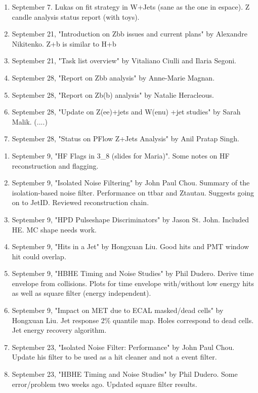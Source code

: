 \begin{enumerate}
\item September 7.  Lukas on fit strategy in W+Jets (sane as the one in espace).  Z candle analysis status report (with toys).
\item September 21, "Introduction on Zbb issues and current plans" by Alexandre Nikitenko.  Z+b is similar to H+b
\item September 21, "Task list overview" by Vitaliano Ciulli and Ilaria Segoni.
\item September 28, "Report on Zbb analysis" by Anne-Marie Magnan.
\item September 28, "Report on Zb(b) analysis" by Natalie Heracleous.
\item September 28, "Update on Z(ee)+jets and W(enu) +jet studies" by Sarah Malik. (....)
\item September 28, "Status on PFlow Z+Jets Analysis" by Anil Pratap Singh.
\end{enumerate}



\begin{enumerate}
\item September 9, "HF Flags in 3\_8 (slides for Maria)".  Some notes on HF reconstruction and flagging.
\item September 9, "Isolated Noise Filtering" by John Paul Chou.  Summary of the isolation-based noise filter.  Performance on ttbar and Ztautau.
Suggests going on to JetID.  Reviewed reconstruction chain.
\item September 9, "HPD Pulseshape Discriminators" by Jason St. John.  Included HE.  MC shape needs work.
\item September 9, "Hits in a Jet" by Hongxuan Liu.  Good hits and PMT window hit could overlap.
\item September 9, "HBHE Timing and Noise Studies" by Phil Dudero.  Derive time envelope from collisions.
Plots for time envelope with/without low energy hits as well as square filter (energy independent).
\item September 9, "Impact on MET due to ECAL masked/dead cells" by Hongxuan Liu.  Jet response 2\% quantile map.  Holes correspond to dead cells.
Jet energy recovery algorithm.
\item September 23, "Isolated Noise Filter: Performance" by John Paul Chou.  Update his filter to be used as a hit cleaner and not a event filter.
\item September 23, "HBHE Timing and Noise Studies" by Phil Dudero.  Some error/problem two weeks ago.  Updated square filter results.
\end{enumerate}

